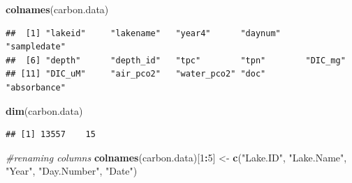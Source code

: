 \documentclass[12pt,]{article}
\newenvironment{Shaded}{\begin{snugshade}}{\end{snugshade}}
\newcommand{\KeywordTok}[1]{\textcolor[rgb]{0.13,0.29,0.53}{\textbf{#1}}}
\newcommand{\DataTypeTok}[1]{\textcolor[rgb]{0.13,0.29,0.53}{#1}}
\newcommand{\DecValTok}[1]{\textcolor[rgb]{0.00,0.00,0.81}{#1}}
\newcommand{\StringTok}[1]{\textcolor[rgb]{0.31,0.60,0.02}{#1}}
\newcommand{\CommentTok}[1]{\textcolor[rgb]{0.56,0.35,0.01}{\textit{#1}}}
\newcommand{\OperatorTok}[1]{\textcolor[rgb]{0.81,0.36,0.00}{\textbf{#1}}}
\newcommand{\NormalTok}[1]{#1}
\begin{document}
\begin{Shaded}
\begin{Highlighting}[]
\KeywordTok{colnames}\NormalTok{(carbon.data)}
\end{Highlighting}
\end{Shaded}

\begin{verbatim}
##  [1] "lakeid"     "lakename"   "year4"      "daynum"     "sampledate"
##  [6] "depth"      "depth_id"   "tpc"        "tpn"        "DIC_mg"    
## [11] "DIC_uM"     "air_pco2"   "water_pco2" "doc"        "absorbance"
\end{verbatim}

\begin{Shaded}
\begin{Highlighting}[]
\KeywordTok{dim}\NormalTok{(carbon.data)}
\end{Highlighting}
\end{Shaded}

\begin{verbatim}
## [1] 13557    15
\end{verbatim}

\begin{Shaded}
\begin{Highlighting}[]
\CommentTok{#renaming columns}
\KeywordTok{colnames}\NormalTok{(carbon.data)[}\DecValTok{1}\OperatorTok{:}\DecValTok{5}\NormalTok{] <-}\StringTok{ }\KeywordTok{c}\NormalTok{(}\StringTok{"Lake.ID"}\NormalTok{, }\StringTok{"Lake.Name"}\NormalTok{, }\StringTok{"Year"}\NormalTok{, }\StringTok{"Day.Number"}\NormalTok{, }\StringTok{"Date"}\NormalTok{)}
\end{Highlighting}
\end{Shaded}

\begin{Shaded}
\end{Shaded}
\end{document}
